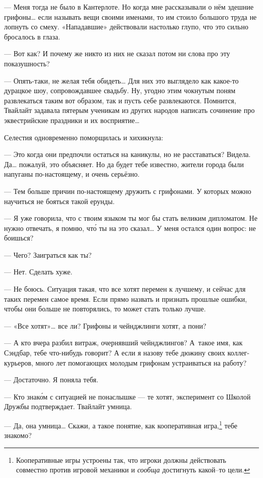 \documentclass[fontsize=11pt,a5paper,titlepage=firstcover]{scrbook}
\begin{document}
--- Меня тогда не было в Кантерлоте. Но когда мне рассказывали о нём здешние грифоны{\ldots} если называть вещи своими именами, то им стоило большого труда не лопнуть со смеху. «Нападавшие» действовали настолько глупо, что это сильно бросалось в глаза.

--- Вот как? И почему же никто из них не сказал потом ни слова про эту показушность?

--- Опять-таки, не желая тебя обидеть{\ldots} Для них это выглядело как какое-то дурацкое шоу, сопровождавшее свадьбу. Ну, угодно этим чокнутым поням развлекаться таким вот образом, так и пусть себе развлекаются. Помнится, Твайлайт задавала пятерым ученикам из других народов написать сочинение про эквестрийские праздники и их восприятие{\ldots}

Селестия одновременно поморщилась и хихикнула:

--- Это когда они предпочли остаться на каникулы, но не расставаться? Видела. Да{\ldots} пожалуй, это объясняет. Но да будет тебе известно, жители города были напуганы по-настоящему, и очень серьёзно.

--- Тем больше причин по-настоящему дружить с грифонами. У которых можно научиться не бояться такой ерунды.

--- Я уже говорила, что с твоим языком ты мог бы стать великим дипломатом. Не нужно отвечать, я помню, что́ ты на это сказал{\ldots} У меня остался один вопрос: не боишься?

--- Чего? Заиграться как ты?

--- Нет. Сделать хуже.

--- Не боюсь. Ситуация такая, что все хотят перемен к лучшему, и сейчас для таких перемен самое время. Если прямо назвать и признать прошлые ошибки, чтобы они больше не повторялись, то может стать только лучше.

--- «Все хотят»{\ldots} все ли? Грифоны и чейнджлинги хотят, а пони?

--- А кто вчера разбил витраж, очернявший чейнджлингов? А~такое имя, как Сэндбар, тебе что-нибудь говорит? А если я назову тебе дюжину своих коллег-курьеров, много лет помогающих молодым грифонам устраиваться на работу?

--- Достаточно. Я поняла тебя.

--- Кто знако́м с ситуацией не понаслышке --- те хотят, эксперимент со Школой Дружбы подтверждает. Твайлайт умница.

--- Да, она умница{\ldots} Скажи, а такое понятие, как кооперативная игра,\footnote{Кооперативные игры устроены так, что игроки должны действовать совместно против игровой механики и \textit{сообща} достигнуть какой--то цели.} тебе знакомо?
\end{document}
